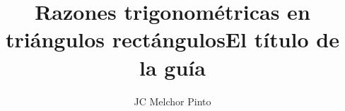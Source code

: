 \documentclass[12pt,addpoints,answers]{guia}
\title{Razones trigonométricas en triángulos rectángulos}
\title{El título de la guía}
\author{JC Melchor Pinto}
\begin{document}
\pagestyle{headandfoot}

\INFO
\printanswers
\vspace{-0.9cm}
\begin{multicols}{2}
    \columnbreak
\end{multicols}
%
% 
% 
\begin{questions}
    \questionboxed[10]{}
    \questionboxed[10]{}
    \questionboxed[10]{}
    \questionboxed[10]{}
    \questionboxed[10]{}
    \questionboxed[10]{}
    \questionboxed[10]{}
    \questionboxed[10]{}
    \questionboxed[10]{}
    \questionboxed[10]{}
    \questionboxed[10]{}
    \questionboxed[10]{}
    \questionboxed[10]{}
    \questionboxed[10]{}
    \questionboxed[10]{}
    \questionboxed[10]{}
    \questionboxed[10]{}
    \questionboxed[10]{}
\end{questions}
\end{document}
